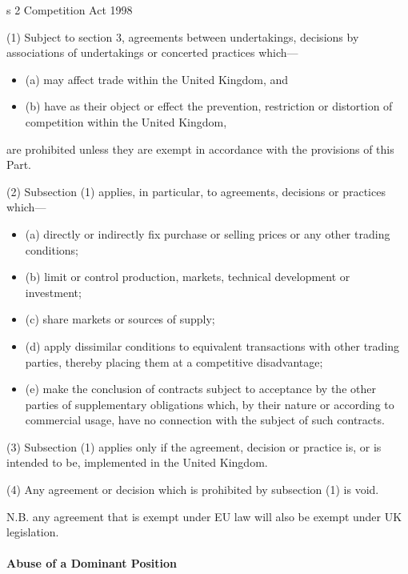 \documentclass[
]{article}
\providecommand{\tightlist}{%
  \setlength{\itemsep}{0pt}\setlength{\parskip}{0pt}}
\newenvironment{env-69c6d983-4e25-44a5-9a13-662902d85e33}
{
    \savenotes\tcolorbox[blanker,breakable,left=5pt,borderline west={2pt}{-4pt}{green}]
}
{
    \endtcolorbox\spewnotes
}
\begin{document}
\begin{env-69c6d983-4e25-44a5-9a13-662902d85e33}

s 2 Competition Act 1998

(1) Subject to section 3, agreements between undertakings, decisions by
associations of undertakings or concerted practices which---

\begin{itemize}
\tightlist
\item
  (a) may affect trade within the United Kingdom, and
\item
  (b) have as their object or effect the prevention, restriction or
  distortion of competition within the United Kingdom,
\end{itemize}

are prohibited unless they are exempt in accordance with the provisions
of this Part.

(2) Subsection (1) applies, in particular, to agreements, decisions or
practices which---

\begin{itemize}
\tightlist
\item
  (a) directly or indirectly fix purchase or selling prices or any other
  trading conditions;
\item
  (b) limit or control production, markets, technical development or
  investment;
\item
  (c) share markets or sources of supply;
\item
  (d) apply dissimilar conditions to equivalent transactions with other
  trading parties, thereby placing them at a competitive disadvantage;
\item
  (e) make the conclusion of contracts subject to acceptance by the
  other parties of supplementary obligations which, by their nature or
  according to commercial usage, have no connection with the subject of
  such contracts.
\end{itemize}

(3) Subsection (1) applies only if the agreement, decision or practice
is, or is intended to be, implemented in the United Kingdom.

(4) Any agreement or decision which is prohibited by subsection (1) is
void.

\end{env-69c6d983-4e25-44a5-9a13-662902d85e33}

N.B. any agreement that is exempt under EU law will also be exempt under
UK legislation.

\hypertarget{abuse-of-a-dominant-position}{%
\paragraph{Abuse of a Dominant
Position}\label{abuse-of-a-dominant-position}}
\end{document}
